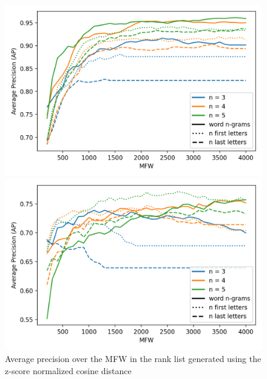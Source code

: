 \begin{figure}
  \centering
  \caption{Average precision over the MFW in the rank list generated using the z-score normalized cosine distance}
  \label{fig:first_last_letters_ngrams}

  \label{fig:first_last_letters_ngrams_oxquarry}
  \includegraphics[width=\linewidth]{img/first_last_letters_ngrams_oxquarry.png}

  \vspace{0.5cm}

  \label{fig:first_last_letters_ngrams_brunet}
  \includegraphics[width=\linewidth]{img/first_last_letters_ngrams_brunet.png}

  \vspace{0.5cm}


\end{figure}

